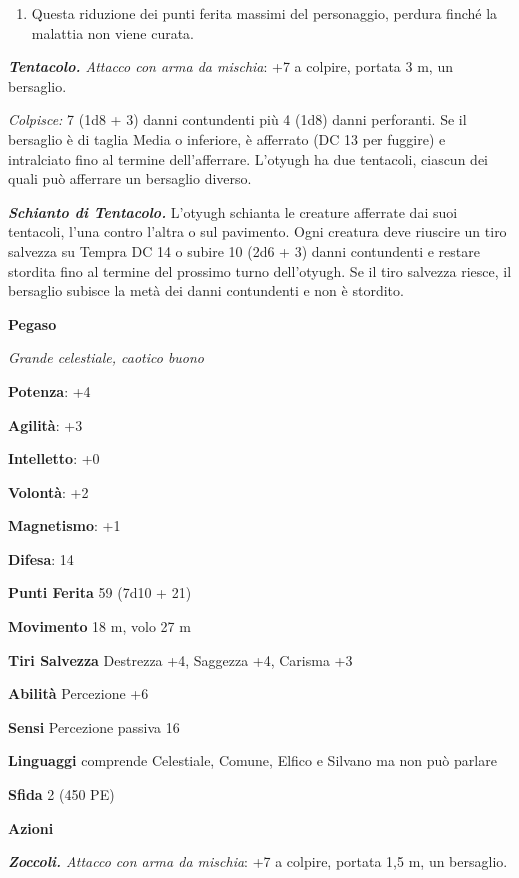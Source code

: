 \begin{multicols}{2}
\begin{enumerate}
\def\labelenumi{\arabic{enumi}.}
\item
  Questa riduzione dei punti ferita massimi del personaggio, perdura
  finché la malattia non viene curata.
\end{enumerate}


\emph{\textbf{Tentacolo.} Attacco con arma da mischia}: +7 a colpire,
portata 3 m, un bersaglio.

\emph{Colpisce:} 7 (1d8 + 3) danni contundenti più 4 (1d8) danni
perforanti. Se il bersaglio è di taglia Media o inferiore, è afferrato
(DC 13 per fuggire) e intralciato fino al termine dell'afferrare.
L'otyugh ha due tentacoli, ciascun dei quali può afferrare un bersaglio
diverso.

\emph{\textbf{Schianto di Tentacolo.}} L'otyugh schianta le creature
afferrate dai suoi tentacoli, l'una contro l'altra o sul pavimento. Ogni
creatura deve riuscire un tiro salvezza su Tempra DC 14 o subire 10 (2d6
+ 3) danni contundenti e restare stordita fino al termine del prossimo
turno dell'otyugh. Se il tiro salvezza riesce, il bersaglio subisce la
metà dei danni contundenti e non è stordito.




\textbf{Pegaso}

\emph{Grande celestiale, caotico buono}

\textbf{Potenza}: +4

\textbf{Agilità}: +3

\textbf{Intelletto}: +0

\textbf{Volontà}: +2

\textbf{Magnetismo}: +1

\textbf{Difesa}: 14

\textbf{Punti Ferita} 59 (7d10 + 21)

\textbf{Movimento} 18 m, volo 27 m

\textbf{Tiri Salvezza} Destrezza +4, Saggezza +4, Carisma +3

\textbf{Abilità} Percezione +6

\textbf{Sensi} Percezione passiva 16

\textbf{Linguaggi} comprende Celestiale, Comune, Elfico e Silvano ma non
può parlare

\textbf{Sfida} 2 (450 PE)

\textbf{Azioni}

\emph{\textbf{Zoccoli.} Attacco con arma da mischia}: +7 a colpire,
portata 1,5 m, un bersaglio.


\end{multicols}
